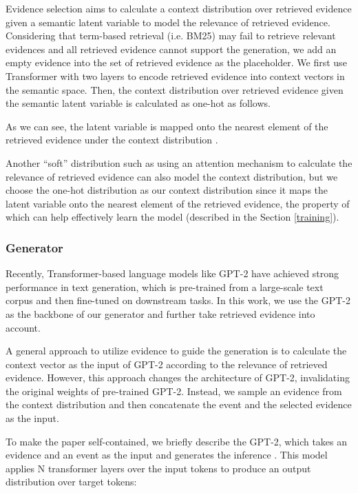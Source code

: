 \documentclass[11pt,a4paper]{article}
\begin{document}
Evidence selection aims to calculate a context distribution  over retrieved evidence given a semantic latent variable  to model the relevance of retrieved evidence. 
Considering that term-based retrieval (i.e. BM25) may fail to retrieve relevant evidences and all retrieved evidence cannot support the generation, we add an empty evidence  into the set  of retrieved evidence as the placeholder. We first use Transformer with two layers to encode retrieved evidence into context vectors  in the semantic space.  Then, the context distribution  over retrieved evidence given the semantic latent variable  is calculated as one-hot as follows.

As we can see, the latent variable  is mapped onto the nearest element  of the retrieved evidence under the context distribution .


Another ``soft'' distribution such as using an attention mechanism to calculate the relevance of retrieved evidence can also model the context distribution, but we choose the one-hot distribution as our context distribution since it maps the latent variable  onto the nearest element of the retrieved evidence, the property of which can help effectively learn the model (described in the Section \ref{training}). 


\subsubsection{Generator}
Recently, Transformer-based \cite{vaswani2017attention} language models like GPT-2 \cite{radford2019language} have achieved strong performance in text generation, which is pre-trained from a large-scale text corpus and then fine-tuned on downstream tasks. In this work, we use the GPT-2  as the backbone of our generator and further take retrieved evidence into account. 

A general approach to utilize evidence to guide the generation is to calculate the context vector  as the input of GPT-2 according to the relevance  of retrieved evidence.
However, this approach changes the architecture of GPT-2, invalidating the original weights of pre-trained GPT-2.
Instead, we sample an evidence  from the context distribution  and then concatenate the event and the selected evidence as the input. 

To make the paper self-contained, we briefly describe the GPT-2, which takes an evidence and an event as the input and generates the inference . 
This model applies N transformer layers over the input tokens to produce an output distribution over target tokens:
\end{document}
